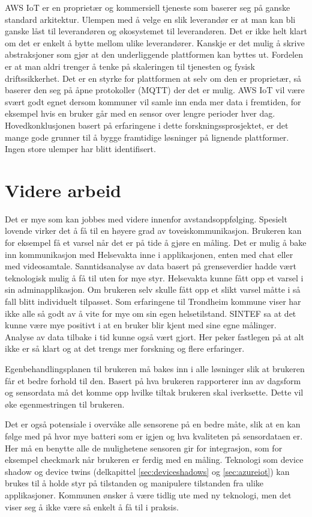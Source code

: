 AWS IoT er en proprietær og kommersiell
tjeneste som baserer seg på ganske standard arkitektur. Ulempen med å velge en slik leverandør er at man kan
bli ganske låst til leverandøren og økosystemet til leverandøren. Det er ikke helt klart om det er enkelt
å bytte mellom ulike leverandører. Kanskje er det mulig å skrive abstraksjoner som gjør at den underliggende
plattformen kan byttes ut. Fordelen er at man aldri trenger å tenke på skaleringen til tjenesten
og fysisk driftssikkerhet. Det er en styrke for plattformen at selv om den er proprietær, så baserer den seg på åpne protokoller
(MQTT) der det er mulig.
AWS IoT vil være svært godt egnet dersom kommuner vil samle inn enda mer
data i fremtiden, for eksempel hvis en bruker går med en sensor over lengre perioder hver dag. Hovedkonklusjonen
basert på erfaringene i dette forskningssprosjektet, er det mange gode grunner til å bygge framtidige
løsninger på lignende plattformer. Ingen store ulemper har blitt identifisert.

\section{Videre arbeid}
Det er mye som kan jobbes med videre innenfor avstandsoppfølging. Spesielt lovende virker det å få til
en høyere grad av toveiskommunikasjon. Brukeren kan for eksempel få et varsel når det er på tide å gjøre en måling.
Det er mulig å bake inn kommunikasjon med Helsevakta inne i applikasjonen, enten med chat eller med videosamtale.
Sanntidsanalyse av data basert på grenseverdier hadde vært teknologisk mulig å få til uten for mye styr. Helsevakta
kunne fått opp et varsel i sin adminapplikasjon. Om brukeren selv skulle fått opp et slikt varsel måtte i så fall blitt
individuelt tilpasset.
Som erfaringene til Trondheim kommune viser har ikke alle så godt av å vite for mye om sin egen
helsetilstand. SINTEF sa at det kunne være mye positivt i at en bruker blir kjent med sine egne målinger.
Analyse av data tilbake i tid kunne også vært gjort. Her peker fastlegen på at alt ikke er så klart og
at det trengs mer forskning og flere erfaringer.

Egenbehandlingsplanen til brukeren må bakes inn i alle løsninger slik at brukeren får et bedre forhold til den.
Basert på hva brukeren rapporterer inn av dagsform og sensordata må det komme opp hvilke tiltak brukeren skal
iverksette. Dette vil øke egenmestringen til brukeren.

Det er også potensiale i overvåke alle sensorene på en bedre måte, slik at en kan følge med på hvor mye batteri som er igjen
og hva kvaliteten på sensordataen er. Her må en benytte alle de mulighetene sensoren gir for integrasjon, som for eksempel
checkmark når brukeren er ferdig med en måling. Teknologi som device shadow og device twins (delkapittel \ref{sec:deviceshadows}
og \ref{sec:azureiot}) kan brukes til å holde styr på tilstanden og manipulere tilstanden fra ulike applikasjoner.
Kommunen ønsker å være tidlig ute med
ny teknologi, men det viser seg å ikke være så enkelt å få til i praksis.

